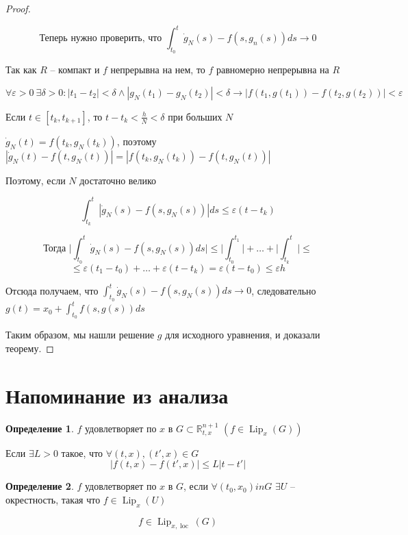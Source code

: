 \documentclass[a4paper]{article}
\theoremstyle{indented}
\theoremstyle{definition}
\newtheorem*{defn}{Определение}
\theoremstyle{remark}
\DeclareMathOperator{\Lip}{Lip}
\DeclareMathOperator{\loc}{loc}
\begin{document}
\begin{proof}
\begin{enumerate}
    \[\text{Теперь нужно проверить, что } \int_{t_0}^{t}\dot g_N(s) - f(s,g_n(s)) ds \to 0\]

    Так как $R$ -- компакт и $f$ непрерывна на нем, то $f$ равномерно непрерывна на $R$

    \[\forall \varepsilon > 0\ \exists \delta > 0 : |t_1 - t_2| < \delta \wedge |g_N(t_1) - g_N(t_2)| < \delta \to |f(t_1,g(t_1)) - f(t_2,g(t_2))| < \varepsilon     \]

    Если $t \in [t_k, t_{k+1}]$, то $t - t_k < \frac{h}{N} < \delta$ при больших $N$

    $\dot g_N(t) = f(t_k,g_N(t_k))$, поэтому $|\dot g_N(t) - f(t,g_N(t))| = |f(t_k,g_N(t_k)) - f(t,g_N(t))|$

    Поэтому, если $N$ достаточно велико

    \[\int_{t_k}^{t}|\dot g_N(s) - f(s,g_N(s)) | ds \leqslant \varepsilon (t-t_k)\]

    \[\text{Тогда }\bigg| \int_{t_0}^{t}\dot g_N(s) - f(s,g_N(s))ds \bigg| \leqslant  \bigg|\int_{t_0}^{t_1}\bigg| + \ldots + \bigg|\int_{t_k}^{t}\bigg| \leqslant \]
    \[\leqslant \varepsilon (t_1-t_0) +\ldots + \varepsilon(t- t_k) = \varepsilon (t - t_0)  \leqslant \varepsilon h\]

    Отсюда получаем, что $\int_{t_0}^{t}\dot g_N(s) - f(s,g_N(s))ds \to 0$, следовательно $g(t) = x_0 + \int_{t_0}^{t}f(s,g(s))ds$

   
  \end{enumerate}

  Таким образом, мы нашли решение $g$ для исходного уравнения, и доказали теорему.
  
\end{proof}

\section{Напоминание из анализа}


\begin{defn}
  $f$  удовлетворяет  по $x$ в $G \subset \mathbb{R}_{t,x}^{n+1}$ $(f \in \Lip_x(G))$

  Если $\exists L > 0$ такое, что $\forall (t,x), (t',x) \in G$
  $$|f(t,x) - f(t',x)| \leqslant L|t - t'|$$

  

\end{defn}

\begin{defn}
  $f$ удовлетворяет  по $x$ в $G$, если $\forall (t_0,x_0) in G$ $\exists U$ -- окрестность, такая что $f \in \Lip_x(U)$

  \[f \in \Lip_{x, \loc}(G)\]

\end{defn}
\end{document}
